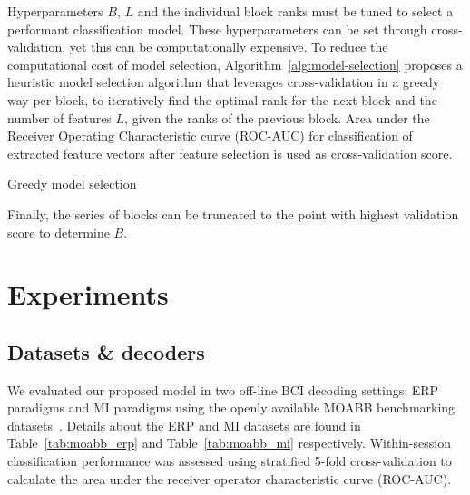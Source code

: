 \documentclass[twocolumn]{article}
\begin{document}
Hyperparameters $B$, $L$ and the individual
block ranks must be tuned to select a performant classification model.
These hyperparameters can be set through cross-validation, yet this can be
computationally expensive.
To reduce the computational cost of model selection,
Algorithm~\ref{alg:model-selection} proposes a heuristic model selection
algorithm that leverages cross-validation in a greedy way per block, to
iteratively find the optimal rank for the next block and the number of features
$L$, given the ranks of the previous block.
Area under the Receiver Operating Characteristic curve (ROC-AUC) for
classification of extracted feature vectors after feature selection is used as
cross-validation score.
\begin{algorithm}
  \caption{Greedy model selection}
  \label{alg:model-selection}
  
\end{algorithm}
Finally, the series of blocks can be truncated to the point with
highest validation score to determine $B$.

\section{Experiments}
\subsection{Datasets \& decoders}
We evaluated our proposed model in two off-line BCI decoding settings: ERP
paradigms and MI paradigms using the openly available MOABB benchmarking
datasets~\cite{Aristimunha2023}.
Details about the ERP and MI datasets are found in Table~\ref{tab:moabb_erp}
and Table~\ref{tab:moabb_mi} respectively.
Within-session classification performance was assessed using stratified 5-fold
cross-validation to calculate the area under the receiver operator
characteristic curve (ROC-AUC).
\end{document}
